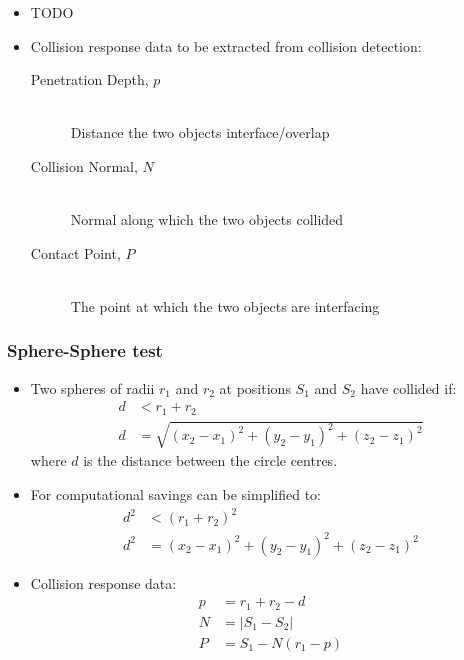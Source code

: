 \documentclass[a4paper]{article}
\begin{document}
\begin{itemize}
  \item
    TODO

  \item
    Collision response data to be extracted from collision detection:
    \begin{description}
      \item[Penetration Depth, $p$] \hfill \\
        Distance the two objects interface/overlap

      \item[Collision Normal, $N$] \hfill \\
        Normal along which the two objects collided

      \item[Contact Point, $P$] \hfill \\
        The point at which the two objects are interfacing

    \end{description}

\end{itemize}

\subsubsection{Sphere-Sphere test}

\begin{itemize}
  \item
    Two spheres of radii $r_{1}$ and $r_{2}$ at positions $S_{1}$ and $S_{2}$
    have collided if:
    \begin{align*}
      d &< r_{1} + r_{2} \\
      d &= \sqrt{(x_{2} - x_{1})^{2} + (y_{2} - y_{1})^{2} + (z_{2} - z_{1})^{2}}
    \end{align*}
    where $d$ is the distance between the circle centres.

  \item
    For computational savings can be simplified to:
    \begin{align*}
      d^{2} &< (r_{1} + r_{2})^{2} \\
      d^{2} &= (x_{2} - x_{1})^{2} + (y_{2} - y_{1})^{2} + (z_{2} - z_{1})^{2}
    \end{align*}

  \item
    Collision response data:
    \begin{align*}
      p &= r_{1} + r_{2} - d \\
      N &= |S_{1} - S_{2}| \\
      P &= S_{1} - N(r_{1} - p)
    \end{align*}

\end{itemize}
\end{document}
